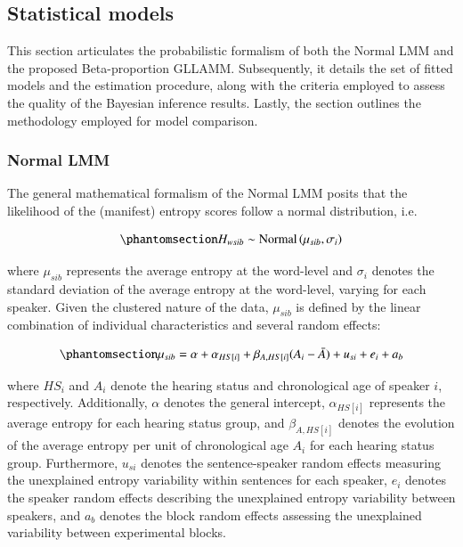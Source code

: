 \documentclass[
  authoryear,
  preprint,
  1p]{elsarticle}
\begin{document}
\subsection{Statistical models}\label{sec-M-SM}

This section articulates the probabilistic formalism of both the Normal
LMM and the proposed Beta-proportion GLLAMM. Subsequently, it details
the set of fitted models and the estimation procedure, along with the
criteria employed to assess the quality of the Bayesian inference
results. Lastly, the section outlines the methodology employed for model
comparison.

\subsubsection{Normal LMM}\label{sec-M-SM-NLMM}

The general mathematical formalism of the Normal LMM posits that the
likelihood of the (manifest) entropy scores follow a normal
distribution, i.e.

\begin{equation}\phantomsection\label{eq-normal-LMM-likelihood}{
H_{wsib} \sim \text{Normal} \left( \mu_{sib}, \sigma_{i} \right)
}\end{equation}

where \(\mu_{sib}\) represents the average entropy at the word-level and
\(\sigma_{i}\) denotes the standard deviation of the average entropy at
the word-level, varying for each speaker. Given the clustered nature of
the data, \(\mu_{sib}\) is defined by the linear combination of
individual characteristics and several random effects:

\begin{equation}\phantomsection\label{eq-normal-LMM-linearpred}{
\mu_{sib} = \alpha + \alpha_{HS[i]} + \beta_{A, HS[i]} (A_{i} - \bar{A}) + u_{si} + e_{i} + a_{b}
}\end{equation}

where \(HS_{i}\) and \(A_{i}\) denote the hearing status and
chronological age of speaker \(i\), respectively. Additionally,
\(\alpha\) denotes the general intercept, \(\alpha_{HS[i]}\) represents
the average entropy for each hearing status group, and
\(\beta_{A,HS[i]}\) denotes the evolution of the average entropy per
unit of chronological age \(A_{i}\) for each hearing status group.
Furthermore, \(u_{si}\) denotes the sentence-speaker random effects
measuring the unexplained entropy variability within sentences for each
speaker, \(e_{i}\) denotes the speaker random effects describing the
unexplained entropy variability between speakers, and \(a_{b}\) denotes
the block random effects assessing the unexplained variability between
experimental blocks.
\end{document}
